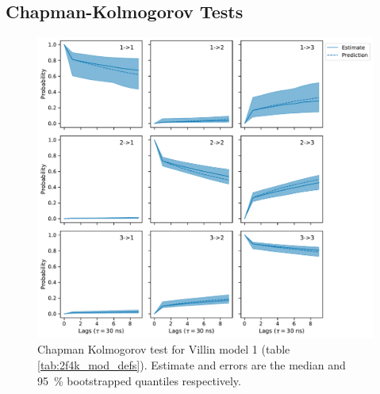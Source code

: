 \documentclass{article}
\begin{document}
\clearpage
\subsection{Chapman-Kolmogorov Tests}

\begin{figure}[h]
    \centering
    \includegraphics[height=0.4\textheight]{figures/cktests/villin/m1_dihed_hpix67_cktest.pdf}
    \caption{Chapman Kolmogorov test for Villin model 1 (table \ref{tab:2f4k_mod_defs}). Estimate and errors are the median and \SI{95}{\percent} bootstrapped quantiles respectively.}
    \label{fig:cktest_villin_1}
\end{figure}
\end{document}
